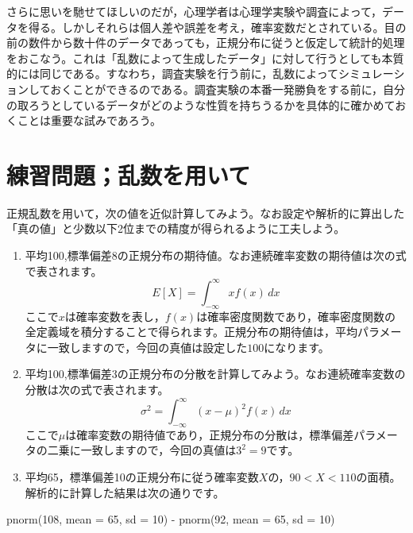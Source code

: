 \documentclass[
  a4paper,
]{ltjsbook}
\newenvironment{Shaded}{\begin{snugshade}}{\end{snugshade}}
\newcommand{\AttributeTok}[1]{\textcolor[rgb]{0.40,0.45,0.13}{#1}}
\newcommand{\DecValTok}[1]{\textcolor[rgb]{0.68,0.00,0.00}{#1}}
\newcommand{\FunctionTok}[1]{\textcolor[rgb]{0.28,0.35,0.67}{#1}}
\newcommand{\NormalTok}[1]{\textcolor[rgb]{0.00,0.23,0.31}{#1}}
\newcommand{\SpecialCharTok}[1]{\textcolor[rgb]{0.37,0.37,0.37}{#1}}
\providecommand{\tightlist}{%
  \setlength{\itemsep}{0pt}\setlength{\parskip}{0pt}}\usepackage{longtable,booktabs,array}
\begin{document}
さらに思いを馳せてほしいのだが，心理学者は心理学実験や調査によって，データを得る。しかしそれらは個人差や誤差を考え，確率変数だとされている。目の前の数件から数十件のデータであっても，正規分布に従うと仮定して統計的処理をおこなう。これは「乱数によって生成したデータ」に対して行うとしても本質的には同じである。すなわち，調査実験を行う前に，乱数によってシミュレーションしておくことができるのである。調査実験の本番一発勝負をする前に，自分の取ろうとしているデータがどのような性質を持ちうるかを具体的に確かめておくことは重要な試みであろう。

\section{練習問題；乱数を用いて}\label{ux7df4ux7fd2ux554fux984cux4e71ux6570ux3092ux7528ux3044ux3066}

正規乱数を用いて，次の値を近似計算してみよう。なお設定や解析的に算出した「真の値」と少数以下2位までの精度が得られるように工夫しよう。

\begin{enumerate}
\def\labelenumi{\arabic{enumi}.}
\tightlist
\item
  平均100,標準偏差8の正規分布の期待値。なお連続確率変数の期待値は次の式で表されます。\[E[X] = \int_{-\infty}^{\infty} x f(x) \, dx\]
  ここで\(x\)は確率変数を表し，\(f(x)\)は確率密度関数であり，確率密度関数の全定義域を積分することで得られます。正規分布の期待値は，平均パラメータに一致しますので，今回の真値は設定した\(100\)になります。
\item
  平均100,標準偏差3の正規分布の分散を計算してみよう。なお連続確率変数の分散は次の式で表されます。\[\sigma^2 = \int_{-\infty}^{\infty} (x - \mu)^2 f(x) \, dx\]
  ここで\(\mu\)は確率変数の期待値であり，正規分布の分散は，標準偏差パラメータの二乗に一致しますので，今回の真値は\(3^2 = 9\)です。
\item
  平均65，標準偏差10の正規分布に従う確率変数\(X\)の，\(90 < X < 110\)の面積。解析的に計算した結果は次の通りです。
\end{enumerate}

\begin{Shaded}
\begin{Highlighting}[]
\FunctionTok{pnorm}\NormalTok{(}\DecValTok{108}\NormalTok{, }\AttributeTok{mean =} \DecValTok{65}\NormalTok{, }\AttributeTok{sd =} \DecValTok{10}\NormalTok{) }\SpecialCharTok{{-}} \FunctionTok{pnorm}\NormalTok{(}\DecValTok{92}\NormalTok{, }\AttributeTok{mean =} \DecValTok{65}\NormalTok{, }\AttributeTok{sd =} \DecValTok{10}\NormalTok{)}
\end{Highlighting}
\end{Shaded}
\end{document}
